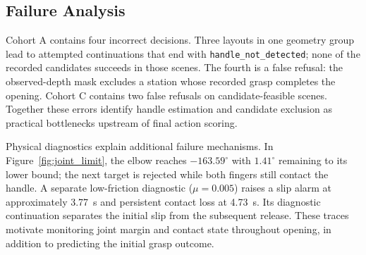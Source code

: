 \subsection{Failure Analysis}
Cohort A contains four incorrect decisions. Three layouts in one geometry
group lead to attempted continuations that end with
\texttt{handle\_not\_detected}; none of the recorded candidates succeeds in
those scenes. The fourth is a false refusal: the observed-depth mask excludes
a station whose recorded grasp completes the opening. Cohort C
contains two false refusals on candidate-feasible scenes. Together these
errors identify handle estimation and candidate exclusion as practical
bottlenecks upstream of final action scoring.

Physical diagnostics explain additional failure mechanisms. In
Figure~\ref{fig:joint_limit}, the elbow reaches $-163.59^\circ$ with
$1.41^\circ$ remaining to its lower bound; the next target is rejected while
both fingers still contact the handle. A separate low-friction diagnostic
($\mu=0.005$) raises a slip alarm at approximately 3.77~s and persistent
contact loss at 4.73~s. Its diagnostic continuation separates the initial
slip from the subsequent release. These traces motivate monitoring joint
margin and contact state throughout opening, in addition to predicting the
initial grasp outcome.
